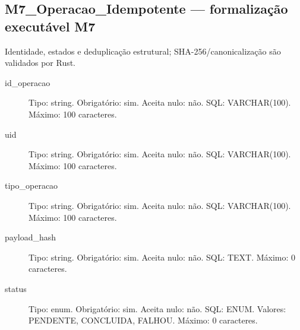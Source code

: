 \subsection*{M7\_Operacao\_Idempotente --- formalização executável M7}
Identidade, estados e deduplicação estrutural; SHA-256/canonicalização são validados por Rust.
\begin{description}
\item[id\_operacao] Tipo: string. Obrigatório: sim. Aceita nulo: não.
SQL: VARCHAR(100).
Máximo: 100 caracteres.
\item[uid] Tipo: string. Obrigatório: sim. Aceita nulo: não.
SQL: VARCHAR(100).
Máximo: 100 caracteres.
\item[tipo\_operacao] Tipo: string. Obrigatório: sim. Aceita nulo: não.
SQL: VARCHAR(100).
Máximo: 100 caracteres.
\item[payload\_hash] Tipo: string. Obrigatório: sim. Aceita nulo: não.
SQL: TEXT.
Máximo: 0 caracteres.
\item[status] Tipo: enum. Obrigatório: sim. Aceita nulo: não.
SQL: ENUM.
Valores: PENDENTE, CONCLUIDA, FALHOU.
Máximo: 0 caracteres.
\end{description}
